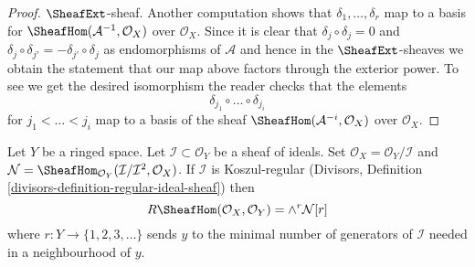\begin{proof}
$\SheafExt$-sheaf.
Another computation shows that $\delta_1, \ldots, \delta_r$
map to a basis for $\SheafHom(\mathcal{A}^{-1}, \mathcal{O}_X)$
over $\mathcal{O}_X$.
Since it is clear that $\delta_j \circ \delta_j = 0$
and $\delta_j \circ \delta_{j'} = - \delta_{j'} \circ \delta_j$
as endomorphisms of $\mathcal{A}$ and hence in the
$\SheafExt$-sheaves
we obtain the statement that our map above factors through
the exterior power. To see we get the desired isomorphism
the reader checks that the elements
$$
\delta_{j_1} \circ \ldots \circ \delta_{j_i}
$$
for $j_1 < \ldots < j_i$ map to a basis of the sheaf
$\SheafHom(\mathcal{A}^{-i}, \mathcal{O}_X)$
over $\mathcal{O}_X$.
\end{proof}

\begin{lemma}
\label{lemma-regular-immersion-ext}
Let $Y$ be a ringed space. Let $\mathcal{I} \subset \mathcal{O}_Y$
be a sheaf of ideals. Set $\mathcal{O}_X = \mathcal{O}_Y/\mathcal{I}$ and
$\mathcal{N} =
\SheafHom_{\mathcal{O}_Y}(\mathcal{I}/\mathcal{I}^2, \mathcal{O}_X)$.
If $\mathcal{I}$ is Koszul-regular
(Divisors, Definition \ref{divisors-definition-regular-ideal-sheaf}) then
$$
R\SheafHom(\mathcal{O}_X, \mathcal{O}_Y) = \wedge^r \mathcal{N}[r]
$$
where $r : Y \to \{1, 2, 3, \ldots \}$ sends $y$ to
the minimal number of generators of $\mathcal{I}$ needed in a neighbourhood
of $y$.
\end{lemma}

